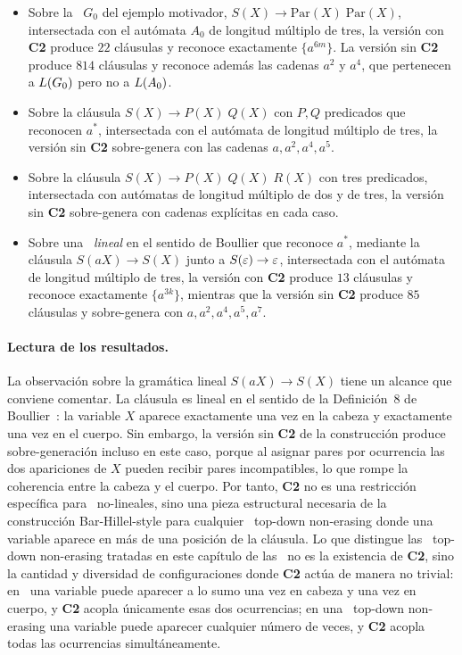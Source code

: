 \begin{itemize}
\item Sobre la \PRCG\ $G_0$ del ejemplo motivador, $S(X) \to \mathrm{Par}(X) \; \mathrm{Par}(X)$, intersectada con el autómata $A_0$ de longitud múltiplo de tres, la versión con \textbf{C2} produce $22$ cláusulas y reconoce exactamente $\{a^{6m}\}$. La versión sin \textbf{C2} produce $814$ cláusulas y reconoce además las cadenas $a^2$ y $a^4$, que pertenecen a $L(G_0)$ pero no a $L(A_0)$.
\item Sobre la cláusula $S(X) \to P(X) \; Q(X)$ con $P, Q$ predicados que reconocen $a^{*}$, intersectada con el autómata de longitud múltiplo de tres, la versión sin \textbf{C2} sobre-genera con las cadenas $a, a^2, a^4, a^5$.
\item Sobre la cláusula $S(X) \to P(X) \; Q(X) \; R(X)$ con tres predicados, intersectada con autómatas de longitud múltiplo de dos y de tres, la versión sin \textbf{C2} sobre-genera con cadenas explícitas en cada caso.
\item Sobre una \PRCG\ \emph{lineal} en el sentido de Boullier que reconoce $a^{*}$, mediante la cláusula $S(aX) \to S(X)$ junto a $S(\varepsilon) \to \varepsilon$, intersectada con el autómata de longitud múltiplo de tres, la versión con \textbf{C2} produce $13$ cláusulas y reconoce exactamente $\{a^{3k}\}$, mientras que la versión sin \textbf{C2} produce $85$ cláusulas y sobre-genera con $a, a^2, a^4, a^5, a^7$.
\end{itemize}

\paragraph{Lectura de los resultados.}

La observación sobre la gramática lineal $S(aX) \to S(X)$ tiene un alcance que conviene comentar. La cláusula es lineal en el sentido de la Definición~8 de Boullier~\cite{REF}: la variable $X$ aparece exactamente una vez en la cabeza y exactamente una vez en el cuerpo. Sin embargo, la versión sin \textbf{C2} de la construcción produce sobre-generación incluso en este caso, porque al asignar pares por ocurrencia las dos apariciones de $X$ pueden recibir pares incompatibles, lo que rompe la coherencia entre la cabeza y el cuerpo. Por tanto, \textbf{C2} no es una restricción específica para \PRCG\ no-lineales, sino una pieza estructural necesaria de la construcción Bar-Hillel-style para cualquier \PRCG\ top-down non-erasing donde una variable aparece en más de una posición de la cláusula. Lo que distingue las \PRCG\ top-down non-erasing tratadas en este capítulo de las \sRCG\ no es la existencia de \textbf{C2}, sino la cantidad y diversidad de configuraciones donde \textbf{C2} actúa de manera no trivial: en \sRCG\ una variable puede aparecer a lo sumo una vez en cabeza y una vez en cuerpo, y \textbf{C2} acopla únicamente esas dos ocurrencias; en una \PRCG\ top-down non-erasing una variable puede aparecer cualquier número de veces, y \textbf{C2} acopla todas las ocurrencias simultáneamente.

